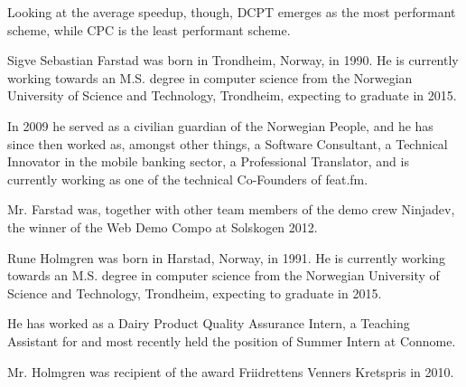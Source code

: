 \documentclass[a4paper]{IEEEtran}
\begin{document}
Looking at the average speedup, though, DCPT emerges as the most performant scheme, while CPC is the least performant scheme.





\nocite{*}

\begin{IEEEbiography}{Sigve Sebastian Farstad}
    was born in Trondheim, Norway, in 1990.
    He is currently working towards an M.S. degree in computer science from the Norwegian University of Science and Technology, Trondheim, expecting to graduate in 2015.

    In 2009 he served as a civilian guardian of the Norwegian People, and he has since then worked as, amongst other things, a Software Consultant, a Technical Innovator in the mobile banking sector, a Professional Translator, and is currently working as one of the technical Co-Founders of feat.fm.

    Mr. Farstad was, together with other team members of the demo crew Ninjadev, the winner of the Web Demo Compo at Solskogen 2012.
\end{IEEEbiography}

\begin{IEEEbiography}{Rune Holmgren}
    was born in Harstad, Norway, in 1991.
    He is currently working towards an M.S. degree in computer science from the Norwegian University of Science and Technology, Trondheim, expecting to graduate in 2015.

    He has worked as a Dairy Product Quality Assurance Intern, a Teaching Assistant for and most recently held the position of Summer Intern at Connome.

    Mr. Holmgren was recipient of the award Friidrettens Venners Kretspris in 2010.
\end{IEEEbiography}
\end{document}
